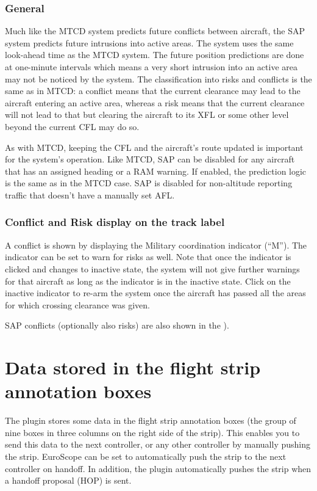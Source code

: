 \documentclass[11pt,a4paper,oldfontcommands]{memoir}
\begin{document}
\subsection*{General}

Much like the MTCD system predicts future conflicts between aircraft, the SAP system predicts future intrusions into active areas. The system uses the same look-ahead time as the MTCD system. The future position predictions are done at one-minute intervals which means a very short intrusion into an active area may not be noticed by the system. The classification into risks and conflicts is the same as in MTCD: a conflict means that the current clearance may lead to the aircraft entering an active area, whereas a risk means that the current clearance will not lead to that but clearing the aircraft to its XFL or some other level beyond the current CFL may do so.

As with MTCD, keeping the CFL and the aircraft’s route updated is important for the system’s operation. Like MTCD, SAP can be disabled for any aircraft that has an assigned heading or a RAM warning. If enabled, the prediction logic is the same as in the MTCD case. SAP is disabled for non-altitude reporting traffic that doesn’t have a manually set AFL.

\subsection*{Conflict and Risk display on the track label}

A conflict is shown by displaying the Military coordination indicator (“M”). The indicator can be set to warn for risks as well. Note that once the indicator is clicked and changes to inactive state, the system will not give further warnings for that aircraft as long as the indicator is in the inactive state. Click on the inactive indicator to re-arm the system once the aircraft has passed all the areas for which crossing clearance was given.

SAP conflicts (optionally also risks) are also shown in the \textit{}).

\chapter{Data stored in the flight strip annotation boxes}

The plugin stores some data in the flight strip annotation boxes (the group of nine boxes in three columns on the right side of the strip). This enables you to send this data to the next controller, or any other controller by manually pushing the strip. EuroScope can be set to automatically push the strip to the next controller on handoff. In addition, the plugin automatically pushes the strip when a handoff proposal (HOP) is sent.
\end{document}
